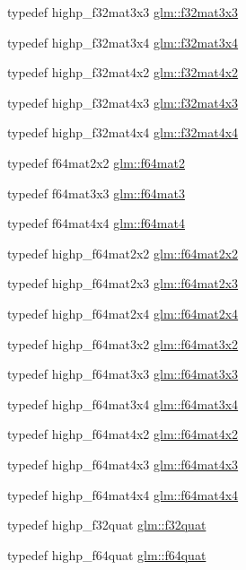 \begin{DoxyCompactItemize}
\item 
typedef highp\+\_\+f32mat3x3 \hyperlink{group__gtc__type__precision_ga715b36ea1e2d1ffaaef7517cc78b3877}{glm\+::f32mat3x3}
\item 
typedef highp\+\_\+f32mat3x4 \hyperlink{group__gtc__type__precision_ga9995b357aa1e9603adad780cfde1aa07}{glm\+::f32mat3x4}
\item 
typedef highp\+\_\+f32mat4x2 \hyperlink{group__gtc__type__precision_gab531a3d0479121732ae090254e0bd58f}{glm\+::f32mat4x2}
\item 
typedef highp\+\_\+f32mat4x3 \hyperlink{group__gtc__type__precision_gad68d998fa74028e02bfadd4778bd549a}{glm\+::f32mat4x3}
\item 
typedef highp\+\_\+f32mat4x4 \hyperlink{group__gtc__type__precision_gac4a4b2671cbf50ab95c55fce2bfcd811}{glm\+::f32mat4x4}
\item 
typedef f64mat2x2 \hyperlink{group__gtc__type__precision_gaf66aa8b74ef627da80162c17a74a04fe}{glm\+::f64mat2}
\item 
typedef f64mat3x3 \hyperlink{group__gtc__type__precision_ga44f23eb3c2e893d0afb1aa2b9e89be76}{glm\+::f64mat3}
\item 
typedef f64mat4x4 \hyperlink{group__gtc__type__precision_ga5bfcfa195cfe908fe50ecc15abbf7979}{glm\+::f64mat4}
\item 
typedef highp\+\_\+f64mat2x2 \hyperlink{group__gtc__type__precision_ga1e14d8b4e18898be51cd719fda213dcc}{glm\+::f64mat2x2}
\item 
typedef highp\+\_\+f64mat2x3 \hyperlink{group__gtc__type__precision_ga6d0196bded514d55e26e0f68dd38b37b}{glm\+::f64mat2x3}
\item 
typedef highp\+\_\+f64mat2x4 \hyperlink{group__gtc__type__precision_gaf18b9f693f2ef743d93c9afd5cfbe229}{glm\+::f64mat2x4}
\item 
typedef highp\+\_\+f64mat3x2 \hyperlink{group__gtc__type__precision_ga0039ae03558b5242466f4c344c3c7d65}{glm\+::f64mat3x2}
\item 
typedef highp\+\_\+f64mat3x3 \hyperlink{group__gtc__type__precision_gab272e67eb87cc1e8233237480c2aa8d2}{glm\+::f64mat3x3}
\item 
typedef highp\+\_\+f64mat3x4 \hyperlink{group__gtc__type__precision_ga36436dae85fc187d4a20d68c4d660a10}{glm\+::f64mat3x4}
\item 
typedef highp\+\_\+f64mat4x2 \hyperlink{group__gtc__type__precision_ga13dbaf75e4f1b18c35d2837067a14ce9}{glm\+::f64mat4x2}
\item 
typedef highp\+\_\+f64mat4x3 \hyperlink{group__gtc__type__precision_gab10a195a85f65da47bf70438f57a8a3c}{glm\+::f64mat4x3}
\item 
typedef highp\+\_\+f64mat4x4 \hyperlink{group__gtc__type__precision_ga6b1ada50de2fc7d991138ab857fb2476}{glm\+::f64mat4x4}
\item 
typedef highp\+\_\+f32quat \hyperlink{group__gtc__type__precision_gac59c4d798396552e4bbb866b3d8a2f18}{glm\+::f32quat}
\item 
typedef highp\+\_\+f64quat \hyperlink{group__gtc__type__precision_ga5b54d7b36fbee5e271f73e6ed74e7172}{glm\+::f64quat}
\end{DoxyCompactItemize}


